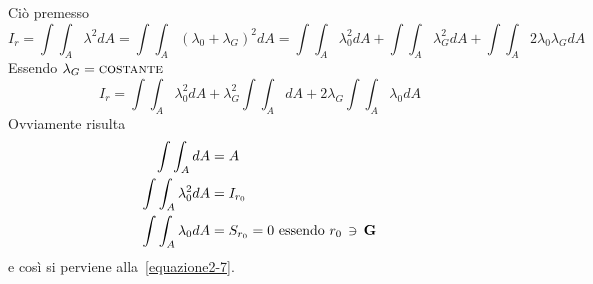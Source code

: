 Ciò premesso
\begin{equation*}
I_r = \int\int_A \lambda^{2}dA = \int\int_A (\lambda_0+\lambda_G)^{2}dA = \int\int_A \lambda_{0}^{2}dA + \int\int_A \lambda_{G}^{2}dA + \int\int_A 2\lambda_{0}\lambda_{G}dA
\end{equation*}
Essendo $\lambda_G=\textup{\textsc{costante}}$
\begin{equation*}
I_r = \int\int_A \lambda_{0}^{2}dA + \lambda_{G}^{2}\int\int_AdA + 2\lambda_{G}\int\int_A \lambda_{0}dA
\end{equation*}
Ovviamente risulta 
\begin{align*}
\int\int_A dA &= A \\
\int\int_A \lambda_{0}^{2}dA &= I_{r_0} \\
\int\int_A \lambda_{0}dA &= S_{r_0} = 0\,\,\textup{essendo}\,\,r_0\,\owns\,\mathbf{G}
\end{align*}
e così si perviene alla~\eqref{equazione2-7}.
